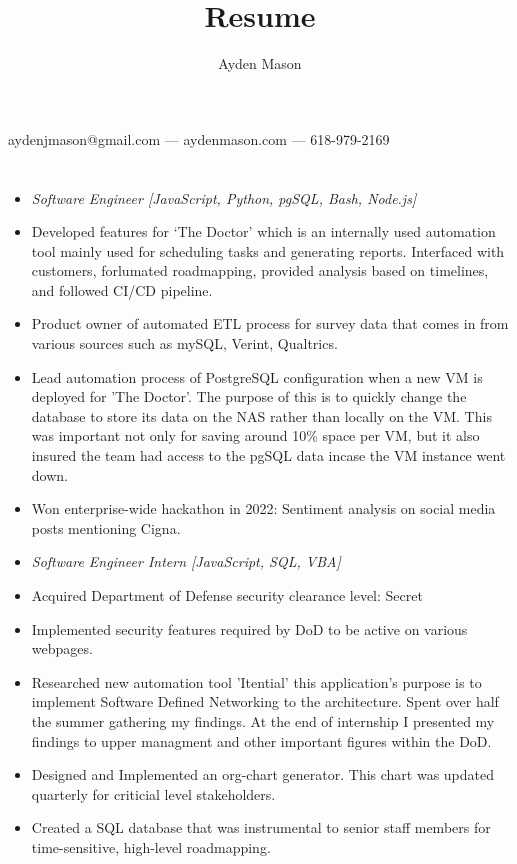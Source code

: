 \documentclass{article}
\makeatletter
\renewcommand{\maketitle}{

\begin{center}
{\huge\bfseries
\theauthor}


aydenjmason@gmail.com --- aydenmason.com --- 618-979-2169
\end{center}
}
\makeatother
\begin{document}
\bgroup\obeylines
\title{Resume}
\author{Ayden Mason}

\maketitle
\section{}
\begin{itemize}
\subsection{Cigna\hfill\mdseries July 2021 - Present}


 \item[] \textit{Software Engineer [JavaScript, Python, pgSQL, Bash, Node.js]}
\item Developed features for ‘The Doctor’ which is an internally used automation tool mainly used for scheduling tasks and generating reports. Interfaced with customers, forlumated roadmapping,  provided analysis based on timelines, and followed CI/CD pipeline.
\item Product owner of automated ETL process for survey data that comes in from various sources such as mySQL, Verint, Qualtrics.
\item Lead automation process of PostgreSQL configuration when a new VM is deployed for 'The Doctor'. The  purpose of this is to quickly change the database to store its data on the NAS rather than locally on the VM. This was important not only for saving around 10\% space per VM, but it also insured the team had access to the pgSQL data incase the VM instance went down.
\item Won enterprise-wide hackathon in 2022: Sentiment analysis on social media posts mentioning Cigna.\\
\end{itemize}
\begin{itemize}
\subsection*{Leidos\hfill\mdseries Summer 2019/2020}
\item[] \textit{Software Engineer Intern [JavaScript, SQL, VBA]}
\item Acquired Department of Defense security clearance level: Secret
\item Implemented security features required by DoD to be active on various webpages.
\item Researched new automation tool 'Itential' this application's purpose is to implement Software Defined Networking to the architecture. Spent over half the summer gathering my findings. At the end of internship I presented my findings to upper managment and other important figures within the DoD.
\item Designed and Implemented an org-chart generator. This chart was updated quarterly for criticial level stakeholders.
\item Created a SQL database that was instrumental to senior staff members for time-sensitive, high-level roadmapping.
\end{itemize}
\end{document}
